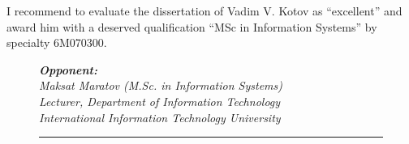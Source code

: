 \begin{titlepage}
    I recommend to evaluate the dissertation of Vadim V. Kotov as ``excellent'' and award him with a deserved qualification ``MSc in Information Systems'' by specialty 6M070300.

        \begin{figure}[ht]
            \begin{minipage}[t]{0.7\linewidth}{\em \small
                {\bf Opponent: }\\
                Maksat Maratov (M.Sc. in Information Systems)\\
                Lecturer, Department of Information Technology\\
                International Information Technology University
                \vspace{14pt}
                
                \rule{13em}{0.4pt}\\
                }
            \end{minipage}
        \end{figure}
        
    \end{titlepage}